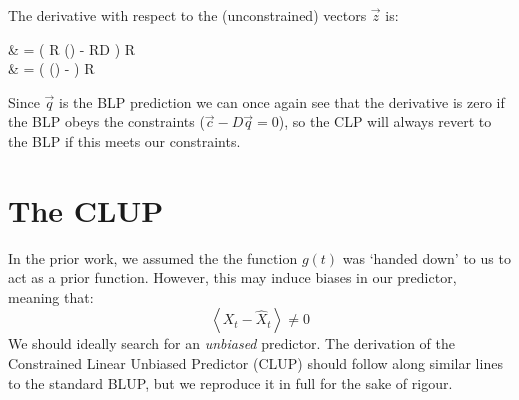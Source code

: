 \documentclass[]{article}
\def\llangle{\left\langle}
\def\rrangle{\right\rangle}
\newcommand\E[1]{\llangle #1 \rrangle}
\begin{document}
			The derivative with respect to the (unconstrained) vectors $\vec{z}$ is:
			\begin{spalign}
				 & = \left( R () - RD  \right) \cdot R 
				\\
				& = \left( () -  \right) \cdot R 
			\end{spalign}
			Since $\vec{q}$ is the BLP prediction we can once again see that the derivative is zero if the BLP obeys the constraints ($\vec{c} - D \vec{q} = 0$), so the CLP will always revert to the BLP if this meets our constraints. 


	\section{The CLUP}

		In the prior work, we assumed the the function $g(t)$ was `handed down' to us to act as a prior function. However, this may induce biases in our predictor, meaning that:
		\begin{equation}
			\E{X_t - \hat{X}_t} \neq 0
		\end{equation}
		We should ideally search for an \textit{unbiased} predictor. The derivation of the Constrained Linear Unbiased Predictor (CLUP) should follow along similar lines to the standard BLUP, but we reproduce it in full for the sake of rigour. 
\end{document}
